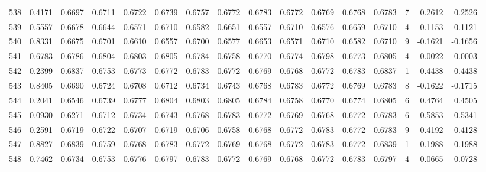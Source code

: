 \begin{tabular}{lrrrrrrrrrrrrrrr}
538 &      0.4171 &  0.6697 &  0.6711 &  0.6722 &  0.6739 &  0.6757 &  0.6772 &  0.6783 &  0.6772 &  0.6769 &   0.6768 &     0.6783 &      7 &                    0.2612 &                     0.2526 \\
539 &      0.5557 &  0.6678 &  0.6644 &  0.6571 &  0.6710 &  0.6582 &  0.6651 &  0.6557 &  0.6710 &  0.6576 &   0.6659 &     0.6710 &      4 &                    0.1153 &                     0.1121 \\
540 &      0.8331 &  0.6675 &  0.6701 &  0.6610 &  0.6557 &  0.6700 &  0.6577 &  0.6653 &  0.6571 &  0.6710 &   0.6582 &     0.6710 &      9 &                   -0.1621 &                    -0.1656 \\
541 &      0.6783 &  0.6786 &  0.6804 &  0.6803 &  0.6805 &  0.6784 &  0.6758 &  0.6770 &  0.6774 &  0.6798 &   0.6773 &     0.6805 &      4 &                    0.0022 &                     0.0003 \\
542 &      0.2399 &  0.6837 &  0.6753 &  0.6773 &  0.6772 &  0.6783 &  0.6772 &  0.6769 &  0.6768 &  0.6772 &   0.6783 &     0.6837 &      1 &                    0.4438 &                     0.4438 \\
543 &      0.8405 &  0.6690 &  0.6724 &  0.6708 &  0.6712 &  0.6734 &  0.6743 &  0.6768 &  0.6783 &  0.6772 &   0.6769 &     0.6783 &      8 &                   -0.1622 &                    -0.1715 \\
544 &      0.2041 &  0.6546 &  0.6739 &  0.6777 &  0.6804 &  0.6803 &  0.6805 &  0.6784 &  0.6758 &  0.6770 &   0.6774 &     0.6805 &      6 &                    0.4764 &                     0.4505 \\
545 &      0.0930 &  0.6271 &  0.6712 &  0.6734 &  0.6743 &  0.6768 &  0.6783 &  0.6772 &  0.6769 &  0.6768 &   0.6772 &     0.6783 &      6 &                    0.5853 &                     0.5341 \\
546 &      0.2591 &  0.6719 &  0.6722 &  0.6707 &  0.6719 &  0.6706 &  0.6758 &  0.6768 &  0.6772 &  0.6783 &   0.6772 &     0.6783 &      9 &                    0.4192 &                     0.4128 \\
547 &      0.8827 &  0.6839 &  0.6759 &  0.6768 &  0.6783 &  0.6772 &  0.6769 &  0.6768 &  0.6772 &  0.6783 &   0.6772 &     0.6839 &      1 &                   -0.1988 &                    -0.1988 \\
548 &      0.7462 &  0.6734 &  0.6753 &  0.6776 &  0.6797 &  0.6783 &  0.6772 &  0.6769 &  0.6768 &  0.6772 &   0.6783 &     0.6797 &      4 &                   -0.0665 &                    -0.0728 \\

\end{tabular}
